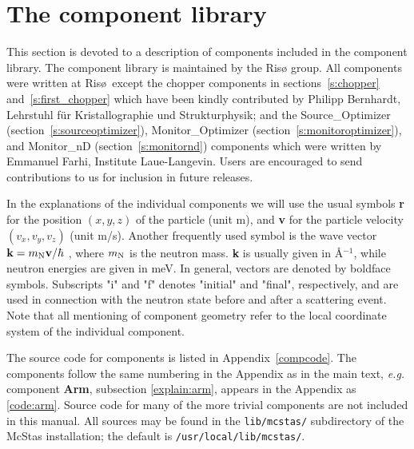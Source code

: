 
\chapter{The component library}
\label{s:components}
This section is devoted to a description of components included in
the component library.  The component library is
maintained by the Ris\o{} group. All components were written at Ris\o\
except the chopper components in
sections~\ref{s:chopper} and~\ref{s:first_chopper} which have been
kindly contributed by Philipp Bernhardt, Lehrstuhl f\"ur
Kristallographie und Strukturphysik; and the Source\_Optimizer
(section~\ref{s:sourceoptimizer}), Monitor\_Optimizer
(section~\ref{s:monitoroptimizer}), and Monitor\_nD
(section~\ref{s:monitornd}) components which were written by Emmanuel
Farhi, Institute Laue-Langevin.
Users are encouraged to send
contributions to us for inclusion in future releases.

In the explanations of the individual components we will use
the usual symbols {\bf r} for the position $(x,y,z)$ of the particle
(unit m), and {\bf v} for 
the particle velocity $(v_x, v_y, v_z)$ (unit m/s).
Another frequently used symbol is 
the wave vector ${\bf k} = m_{\rm N} {\bf v}/\hbar$ , where
$m_{\rm N}$ is the neutron mass. {\bf k} is usually given in
\AA$^{-1}$, while neutron energies are given in meV.
In general, vectors are denoted by boldface symbols.
Subscripts "i" and "f" denotes "initial" and "final", respectively,
and are used in connection with the neutron state before and after
a scattering event.
Note that all mentioning of component geometry refer to
the local coordinate system of the individual component.

The source code for components is listed 
in Appendix~\ref{compcode}. 
The components follow the same numbering
in the Appendix as in the main text, \textit{e.g.} 
component \textbf{Arm}, subsection \ref{explain:arm},
appears in the Appendix as \ref{code:arm}.
Source code for many of the more trivial components are not included in
this manual. All sources may be found in the \verb+lib/mcstas/+
subdirectory of the McStas installation; the default is \verb+/usr/local/lib/mcstas/+.









